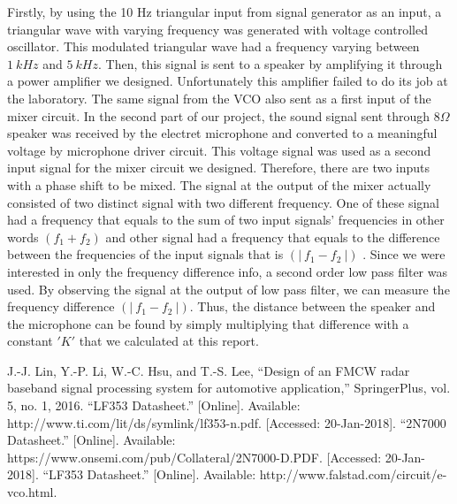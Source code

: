 \documentclass[paper]{IEEEtran}
\begin{document}
	Firstly, by using the 10 Hz triangular input from signal generator as an input, a triangular wave with varying frequency was generated with voltage controlled oscillator. This modulated triangular wave had a frequency varying between $1~kHz$ and $5~kHz$. Then, this signal is sent to a speaker by amplifying it through a power amplifier we designed. Unfortunately this amplifier failed to do its job at the laboratory. The same signal from the VCO also sent as a first input of the mixer circuit. In the second part of our project, the sound signal sent through $8\Omega$ speaker was received by the electret microphone and converted to a meaningful voltage by microphone driver circuit. This voltage signal was used as a second input signal for the mixer circuit we designed. Therefore, there are two inputs with a phase shift to be mixed. The signal at the output of the mixer actually consisted of two distinct signal with two different frequency. One of these signal had a frequency that equals to the sum of two input signals' frequencies in other words $ (f_1+f_2)$ and other signal had a frequency that equals to the difference between the frequencies of the input signals that is $(|~f_1 -f_2~|) $ . Since we were interested in only the frequency difference info, a second order low pass filter was used. By observing the signal at the output of low pass filter, we can measure the frequency difference $(|~f_1 -f_2~|) $. Thus, the distance between the speaker and the microphone can be found by simply multiplying that difference with a constant $'K'$ that we calculated at this report.

 


\begin{thebibliography}{00}
 J.-J. Lin, Y.-P. Li, W.-C. Hsu, and T.-S. Lee, “Design of an FMCW radar baseband signal processing system for automotive application,” SpringerPlus, vol. 5, no. 1, 2016.	
 “LF353 Datasheet.” [Online]. Available: http://www.ti.com/lit/ds/symlink/lf353-n.pdf. [Accessed: 20-Jan-2018].
 “2N7000 Datasheet.” [Online]. Available: https://www.onsemi.com/pub/Collateral/2N7000-D.PDF. [Accessed: 20-Jan-2018].
 “LF353 Datasheet.” [Online]. Available: http://www.falstad.com/circuit/e-vco.html.

\end{thebibliography}
\end{document}
